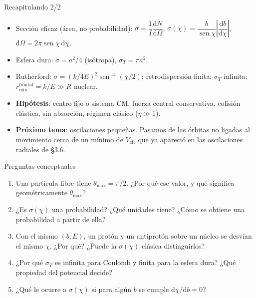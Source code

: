 \documentclass[aspectratio=169]{beamer}
\providecommand{\sen}{}
\renewcommand{\sen}{\operatorname{sen}}
\newcommand{\tmax}{\theta_{\max}}
\newcommand{\rmin}{r_{\min}}
\newcommand{\dd}{\mathrm{d}}
\begin{document}
\begin{frame}{Recapitulando 2/2}
\begin{itemize}
  \item<1-> Sección eficaz (área, no probabilidad):
        $\sigma=\dfrac1I\dfrac{\dd\dot N}{\dd\Omega}$,
        \; $\sigma(\chi)=\dfrac{b}{\sen\chi}\left|\dfrac{\dd b}{\dd\chi}\right|$,
        \; $\dd\Omega=2\pi\sen\chi\,\dd\chi$.
  \item<2-> Esfera dura: $\sigma=a^{2}/4$ (isótropa), $\sigma_T=\pi a^{2}$.
  \item<3-> Rutherford: $\sigma=(k/4E)^{2}\sen^{-4}(\chi/2)$; retrodispersión finita;
        $\sigma_T$ infinita; $\rmin^{\text{frontal}}=k/E\gg R$ nuclear.
  \item<4-> \textbf{Hipótesis}: centro fijo o sistema CM, fuerza central conservativa,
        colisión elástica, sin absorción, régimen clásico ($\eta\gg1$).
  \item<5-> \textbf{Próximo tema}: oscilaciones pequeñas. Pasamos de las órbitas no ligadas
        al movimiento cerca de un mínimo de $V_{\text{ef}}$, que ya apareció en las
        oscilaciones radiales de §3.6.
\end{itemize}
\end{frame}

\begin{frame}{Preguntas conceptuales}
\begin{enumerate}
  \item<1-> Una partícula libre tiene $\tmax=\pi/2$. ¿Por qué ese valor, y qué significa
        geométricamente $\tmax$?
  \item<2-> ¿Es $\sigma(\chi)$ una probabilidad? ¿Qué unidades tiene? ¿Cómo se obtiene
        una probabilidad a partir de ella?
  \item<3-> Con el mismo $(b,E)$, un protón y un antiprotón sobre un núcleo se desvían
        el mismo $\chi$. ¿Por qué? ¿Puede la $\sigma(\chi)$ clásica distinguirlos?
  \item<4-> ¿Por qué $\sigma_T$ es infinita para Coulomb y finita para la esfera dura?
        ¿Qué propiedad del potencial decide?
  \item<5-> ¿Qué le ocurre a $\sigma(\chi)$ si para algún $b$ se cumple
        $\dd\chi/\dd b=0$?
\end{enumerate}
\end{frame}
\end{document}
